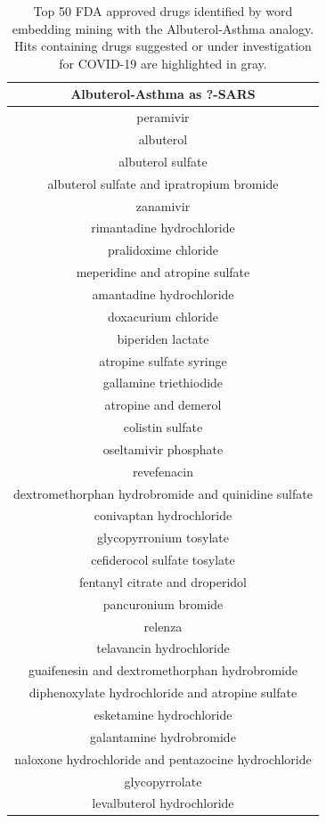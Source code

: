 \documentclass{article}
\begin{document}
\begin{table}[t!]
\footnotesize
\centering
\caption{Top 50 FDA approved drugs identified by word embedding mining with the Albuterol-Asthma analogy. Hits containing drugs suggested or under investigation for COVID-19 are highlighted in gray.}
\label{tab:drugs_albu_top50}
\begin{tabular}[t]{c}
\hline
Albuterol-Asthma as ?-SARS \\
\hline
peramivir \\
albuterol \\
albuterol sulfate \\
albuterol sulfate and ipratropium bromide \\
zanamivir \\
rimantadine hydrochloride \\
pralidoxime chloride \\
meperidine and atropine sulfate \\
amantadine hydrochloride \\
doxacurium chloride \\
biperiden lactate \\
atropine sulfate syringe \\
gallamine triethiodide \\
atropine and demerol \\
colistin sulfate \\
oseltamivir phosphate \\
revefenacin \\
dextromethorphan hydrobromide and quinidine sulfate \\
conivaptan hydrochloride \\
glycopyrronium tosylate \\
cefiderocol sulfate tosylate \\
fentanyl citrate and droperidol \\
pancuronium bromide \\
relenza \\
telavancin hydrochloride \\
guaifenesin and dextromethorphan hydrobromide \\
diphenoxylate hydrochloride and atropine sulfate \\
esketamine hydrochloride \\
galantamine hydrobromide \\
naloxone hydrochloride and pentazocine hydrochloride \\
glycopyrrolate \\
levalbuterol hydrochloride \\

\end{tabular}
\end{table}
\end{document}

